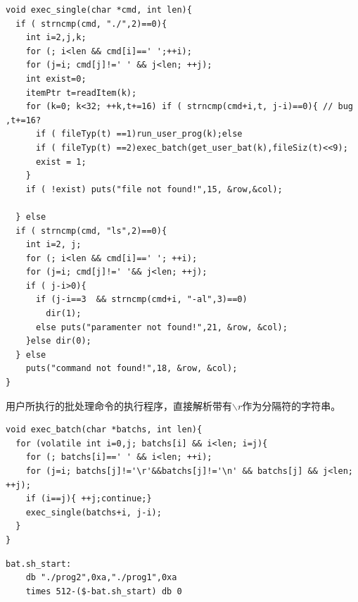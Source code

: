 \documentclass[a4paper,11pt,UTF8]{ctexart}
\begin{document}
      \begin{lstlisting}[caption={解释并执行用户程序},captionpos=b]
void exec_single(char *cmd, int len){
  if ( strncmp(cmd, "./",2)==0){
    int i=2,j,k;
    for (; i<len && cmd[i]==' ';++i);
    for (j=i; cmd[j]!=' ' && j<len; ++j);
    int exist=0;
    itemPtr t=readItem(k);
    for (k=0; k<32; ++k,t+=16) if ( strncmp(cmd+i,t, j-i)==0){ // bug ,t+=16?
      if ( fileTyp(t) ==1)run_user_prog(k);else
      if ( fileTyp(t) ==2)exec_batch(get_user_bat(k),fileSiz(t)<<9);
      exist = 1;
    }
    if ( !exist) puts("file not found!",15, &row,&col);
    
  }	else
  if ( strncmp(cmd, "ls",2)==0){
    int i=2, j;
    for (; i<len && cmd[i]==' '; ++i);
    for (j=i; cmd[j]!=' '&& j<len; ++j);
    if ( j-i>0){
      if (j-i==3  && strncmp(cmd+i, "-al",3)==0)
        dir(1);
      else puts("paramenter not found!",21, &row, &col);
    }else dir(0);
  }	else
    puts("command not found!",18, &row, &col);
}
      \end{lstlisting}

      用户所执行的批处理命令的执行程序，直接解析带有$\backslash r$作为分隔符的字符串。

            \begin{lstlisting}[caption={执行用户批处理文件},captionpos=b]
void exec_batch(char *batchs, int len){
  for (volatile int i=0,j; batchs[i] && i<len; i=j){
    for (; batchs[i]==' ' && i<len; ++i);
    for (j=i; batchs[j]!='\r'&&batchs[j]!='\n' && batchs[j] && j<len; ++j);
    if (i==j){ ++j;continue;}
    exec_single(batchs+i, j-i);
  }
}
      \end{lstlisting}

  \begin{lstlisting}[caption={批处理程序内容 },tabsize=4,basicstyle=\footnotesize,captionpos=b]
    bat.sh_start:
    db "./prog2",0xa,"./prog1",0xa
    times 512-($-bat.sh_start) db 0
      
  \end{lstlisting}
  
\end{document}
